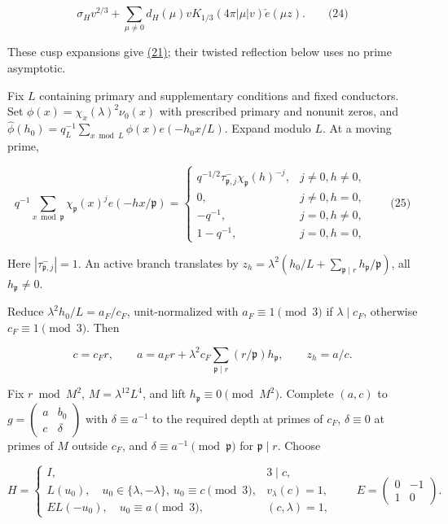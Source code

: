 \hypertarget{cf:eq:B.8}{}

\label{cf:eq:B.8}

\[
\sigma_Hv^{2/3}+\sum_{\mu\ne0}d_H(\mu)vK_{1/3}(4\pi|\mu|v)\check e(\mu z).
\qquad\text{(24)}
\]

These cusp expansions give \protect\hyperlink{cf:eq:B.5}{(21)}; their twisted reflection below uses no prime asymptotic.

Fix \(L\) containing primary and supplementary conditions and fixed conductors. Set \(\phi(x)=\chi_x(\lambda)^2\nu_0(x)\) with prescribed primary and nonunit zeros, and \(\widehat\phi(h_0)=q_L^{-1}\sum_{x\bmod L}\phi(x)e(-h_0x/L)\). Expand modulo \(L\). At a moving prime,

\hypertarget{cf:eq:B.9}{}

\label{cf:eq:B.9}

\[
q^{-1}\sum_{x\bmod\mathfrak p}\chi_{\mathfrak p}(x)^j e(-hx/\mathfrak p)
=\begin{cases}
q^{-1/2}\tau^-_{\mathfrak p,j}\chi_{\mathfrak p}(h)^{-j},&j\ne0, h\ne0,\\
0,&j\ne0, h=0,\\
-q^{-1},&j=0, h\ne0,\\
1-q^{-1},&j=0, h=0,
\end{cases}
\qquad\text{(25)}
\]

Here \(|\tau^-_{\mathfrak p,j}|=1\). An active branch translates by \(z_h=\lambda^2(h_0/L+\sum_{\mathfrak p\mid r}h_{\mathfrak p}/\mathfrak p)\), all \(h_{\mathfrak p}\ne0\).

Reduce \(\lambda^2h_0/L=a_F/c_F\), unit-normalized with \(a_F\equiv1\pmod3\) if \(\lambda\mid c_F\), otherwise \(c_F\equiv1\pmod3\). Then

\[
c=c_Fr,\qquad a=a_Fr+\lambda^2c_F\sum_{\mathfrak p\mid r}(r/\mathfrak p)h_{\mathfrak p},
\qquad z_h=a/c.
\]

Fix \(r\bmod M^2\), \(M=\lambda^{12}L^4\), and lift \(h_{\mathfrak p}\equiv0\pmod{M^2}\). Complete \((a,c)\) to \(g=\left(\begin{smallmatrix}a&b_0\\c&\delta\end{smallmatrix}\right)\) with \(\delta\equiv a^{-1}\) to the required depth at primes of \(c_F\), \(\delta\equiv0\) at primes of \(M\) outside \(c_F\), and \(\delta\equiv a^{-1}\pmod{\mathfrak p}\) for \(\mathfrak p\mid r\). Choose

\[
H=\begin{cases}
I,&3\mid c,\\
L(u_0),\quad u_0\in\{\lambda,-\lambda\},\ u_0\equiv c\pmod3,
&v_\lambda(c)=1,\\
EL(-u_0),\quad u_0\equiv a\pmod3,&(c,\lambda)=1,
\end{cases}
\qquad E=\begin{pmatrix}0&-1\\1&0\end{pmatrix}.
\]

